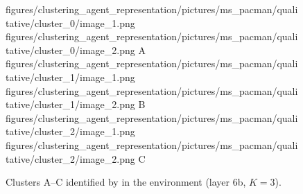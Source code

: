 \begin{figure}[H]
    \qualitativeClusterFigureSetup
    \qualitativeClusterTwo
        {figures/clustering_agent_representation/pictures/ms_pacman/qualitative/cluster_0/image_1.png}
        {figures/clustering_agent_representation/pictures/ms_pacman/qualitative/cluster_0/image_2.png}
        {A}
    \qualitativeClusterTwo
        {figures/clustering_agent_representation/pictures/ms_pacman/qualitative/cluster_1/image_1.png}
        {figures/clustering_agent_representation/pictures/ms_pacman/qualitative/cluster_1/image_2.png}
        {B}
    \qualitativeClusterTwo
        {figures/clustering_agent_representation/pictures/ms_pacman/qualitative/cluster_2/image_1.png}
        {figures/clustering_agent_representation/pictures/ms_pacman/qualitative/cluster_2/image_2.png}
        {C}
    \caption{Clusters A--C identified by  in the \MsPacManName environment (layer 6b, $K=3$).}
    \label{fig:qualitative_ms_pacman}
\end{figure}
